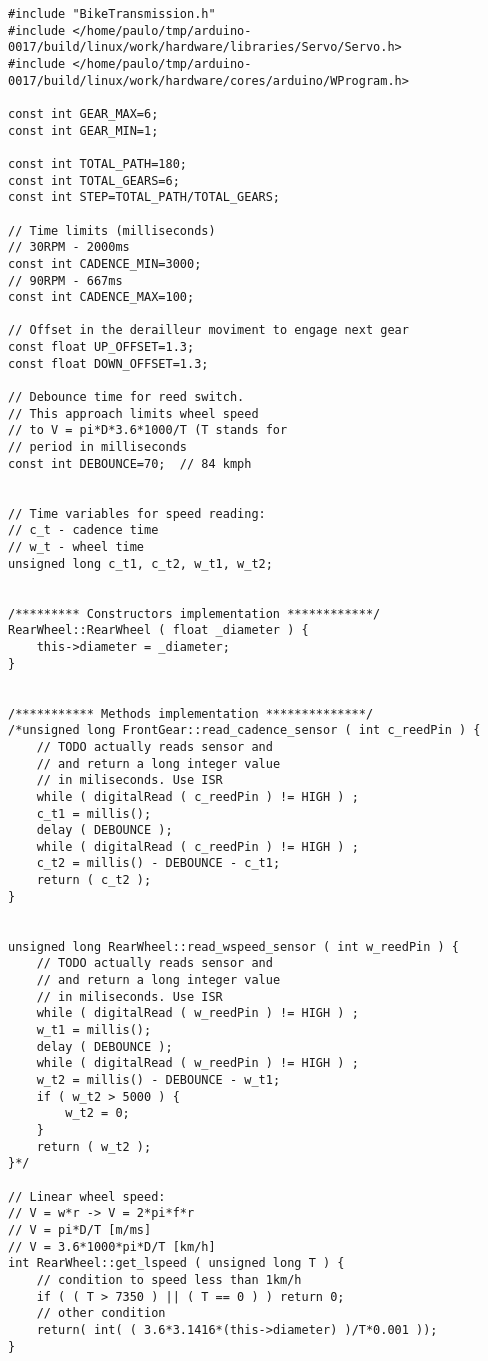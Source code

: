 \documentclass[a4paper,11pt]{article}
\begin{document}
\begin{lstlisting}
#include "BikeTransmission.h"
#include </home/paulo/tmp/arduino-0017/build/linux/work/hardware/libraries/Servo/Servo.h>
#include </home/paulo/tmp/arduino-0017/build/linux/work/hardware/cores/arduino/WProgram.h>

const int GEAR_MAX=6;
const int GEAR_MIN=1;

const int TOTAL_PATH=180;
const int TOTAL_GEARS=6;
const int STEP=TOTAL_PATH/TOTAL_GEARS;

// Time limits (milliseconds)
// 30RPM - 2000ms
const int CADENCE_MIN=3000;
// 90RPM - 667ms
const int CADENCE_MAX=100;

// Offset in the derailleur moviment to engage next gear
const float UP_OFFSET=1.3;
const float DOWN_OFFSET=1.3;

// Debounce time for reed switch.
// This approach limits wheel speed
// to V = pi*D*3.6*1000/T (T stands for
// period in milliseconds
const int DEBOUNCE=70;  // 84 kmph


// Time variables for speed reading:
// c_t - cadence time
// w_t - wheel time
unsigned long c_t1, c_t2, w_t1, w_t2;


/********* Constructors implementation ************/
RearWheel::RearWheel ( float _diameter ) {
    this->diameter = _diameter;
}


/*********** Methods implementation **************/
/*unsigned long FrontGear::read_cadence_sensor ( int c_reedPin ) {
    // TODO actually reads sensor and
    // and return a long integer value
    // in miliseconds. Use ISR
    while ( digitalRead ( c_reedPin ) != HIGH ) ;
    c_t1 = millis();
    delay ( DEBOUNCE );
    while ( digitalRead ( c_reedPin ) != HIGH ) ;
    c_t2 = millis() - DEBOUNCE - c_t1;
    return ( c_t2 );
}


unsigned long RearWheel::read_wspeed_sensor ( int w_reedPin ) {
    // TODO actually reads sensor and
    // and return a long integer value
    // in miliseconds. Use ISR
    while ( digitalRead ( w_reedPin ) != HIGH ) ;
    w_t1 = millis();
    delay ( DEBOUNCE );
    while ( digitalRead ( w_reedPin ) != HIGH ) ;
    w_t2 = millis() - DEBOUNCE - w_t1;
    if ( w_t2 > 5000 ) {
        w_t2 = 0;
    }
    return ( w_t2 );
}*/

// Linear wheel speed:
// V = w*r -> V = 2*pi*f*r
// V = pi*D/T [m/ms]
// V = 3.6*1000*pi*D/T [km/h]
int RearWheel::get_lspeed ( unsigned long T ) {
    // condition to speed less than 1km/h
    if ( ( T > 7350 ) || ( T == 0 ) ) return 0;
    // other condition
    return( int( ( 3.6*3.1416*(this->diameter) )/T*0.001 ));
}


\end{lstlisting}
\end{document}
